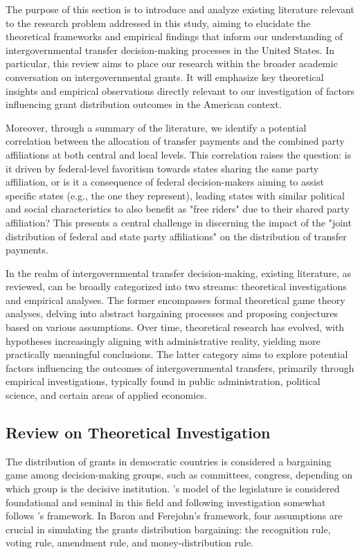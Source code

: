 The purpose of this section is to introduce and analyze existing literature relevant to the research problem addressed in this study, aiming to elucidate the theoretical frameworks and empirical findings that inform our understanding of intergovernmental transfer decision-making processes in the United States. In particular, this review aims to place our research within the broader academic conversation on intergovernmental grants. It will emphasize key theoretical insights and empirical observations directly relevant to our investigation of factors influencing grant distribution outcomes in the American context.

Moreover, through a summary of the literature, we identify a potential correlation between the allocation of transfer payments and the combined party affiliations at both central and local levels. This correlation raises the question: is it driven by federal-level favoritism towards states sharing the same party affiliation, or is it a consequence of federal decision-makers aiming to assist specific states (e.g., the one they represent), leading states with similar political and social characteristics to also benefit as "free riders" due to their shared party affiliation? This presents a central challenge in discerning the impact of the "joint distribution of federal and state party affiliations" on the distribution of transfer payments.

In the realm of intergovernmental transfer decision-making, existing literature, as reviewed, can be broadly categorized into two streams: theoretical investigations and empirical analyses. The former encompasses formal theoretical game theory analyses, delving into abstract bargaining processes and proposing conjectures based on various assumptions. Over time, theoretical research has evolved, with hypotheses increasingly aligning with administrative reality, yielding more practically meaningful conclusions. The latter category aims to explore potential factors influencing the outcomes of intergovernmental transfers, primarily through empirical investigations, typically found in public administration, political science, and certain areas of applied economics.

\subsection{Review on Theoretical Investigation}

The distribution of grants in democratic countries is considered a bargaining game among decision-making groups, such as committees, congress, depending on which group is the decisive institution. \textcite{baron1989bargaining}'s model of the legislature is considered foundational and seminal in this field and following investigation somewhat follows \textcite{baron1989bargaining}'s framework. In Baron and Ferejohn's framework, four assumptions are crucial in simulating the grants distribution bargaining: the recognition rule, voting rule, amendment rule, and money-distribution rule.

